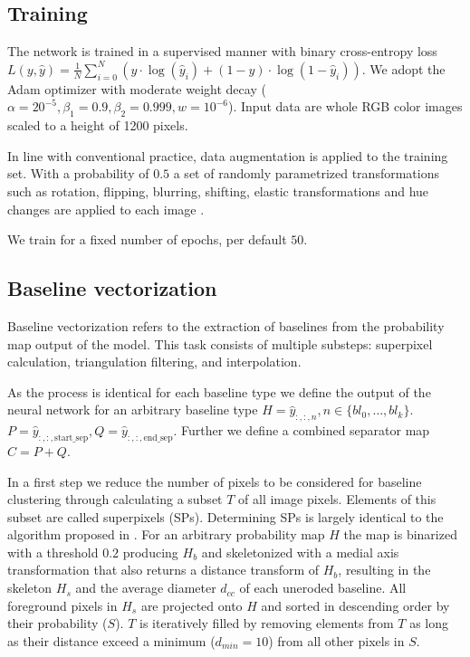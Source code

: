 \subsection{Training}

The network is trained in a supervised manner with binary cross-entropy loss
$L(y, \hat{y}) = \frac{1}{N}\sum^N_{i=0}(y\cdot \log(\hat{y}_i)+(1-y)\cdot
\log(1-\hat{y}_i))$. We adopt the Adam optimizer with moderate weight decay
($\alpha = 20^{-5}, \beta_1 = 0.9, \beta_2 = 0.999, w = 10^{-6}$). Input data
are whole RGB color images scaled to a height of 1200 pixels.

In line with conventional practice, data augmentation is applied to the
training set. With a probability of $0.5$ a set of randomly parametrized
transformations such as rotation, flipping, blurring, shifting, elastic
transformations and hue changes are applied to each image \cite{info11020125}.

We train for a fixed number of epochs, per default $50$.

\subsection{Baseline vectorization }

Baseline vectorization refers to the extraction of baselines from the
probability map output of the model. This task consists of multiple substeps:
superpixel calculation, triangulation filtering, and interpolation.

As the process is identical for each baseline type we define the output of the
neural network for an arbitrary baseline type $H = \hat{y}_{:,:,n}, n \in
\{bl_0, \dots, bl_k\}$. $P = \hat{y}_{:,:,\text{start\_sep}}, Q =
\hat{y}_{:,:,\text{end\_sep}}$.  Further we define a combined separator map $C = P + Q$.

In a first step we reduce the number of pixels to be considered for baseline
clustering through calculating a subset $T$ of all image pixels. Elements of
this subset are called superpixels (SPs). Determining SPs is largely identical
to the algorithm proposed in \cite{gruning2019two}. For an arbitrary
probability map $H$ the map is binarized with a threshold $0.2$ producing $H_b$
and skeletonized with a medial axis transformation that also returns a distance
transform of $H_b$, resulting in the skeleton $H_s$ and the  average
diameter $d_{cc}$ of each uneroded baseline. All foreground pixels in $H_s$ are
projected onto $H$ and sorted in descending order by their probability ($S$).
$T$ is iteratively filled by removing elements from $T$ as long as their
distance exceed a minimum ($d_{min} = 10$) from all other pixels in $S$.

